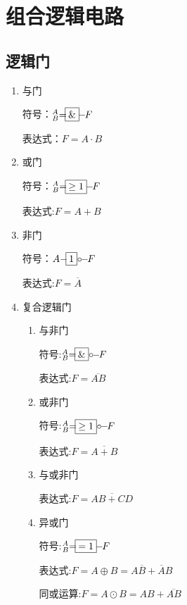 \chapter{组合逻辑电路}
\newpage

\section{逻辑门}

\begin{enumerate}

\item 与门

符号：$^A_B{\large=}\!\boxed{\&}\!\!-\!\!{\small F}$

表达式：$F=A \cdot B$

\item 或门

符号：$^A_B{\large=}\!\boxed{\geq{1}}\!\!-\!\!{\small F}$

表达式:$F=A+B$

\item 非门

符号：$A{\large-}\!\boxed{1}{\normalsize\circ}\!\!-\!\!{\small F}$

表达式:$F=\overline A$

\item 复合逻辑门

\begin{enumerate}

    \item 与非门

          符号:$^A_B{\large=}\!\boxed{\&}{\normalsize\circ} \!\!-\!\!{\small F}$

          表达式:$F=\overline{AB}$

    \item 或非门

          符号:$^A_B{\large=}\!\boxed{\geq{1}}{\normalsize\circ} \!\!-\!\!{\small F}$

          表达式:$F=\overline{A+B}$

    \item 与或非门

          表达式:$F=\overline{AB+CD}$

    \item 异或门

          符号:$^A_B{\large=}\!\boxed{={1}} \!\!-\!\!{\small F}$

          表达式:$F=A\oplus{}B=A\overline{B}+\overline{A}B$

          同或运算:$F=A\odot{}B=AB+\overline{AB}$

\end{enumerate}

\end{enumerate}

